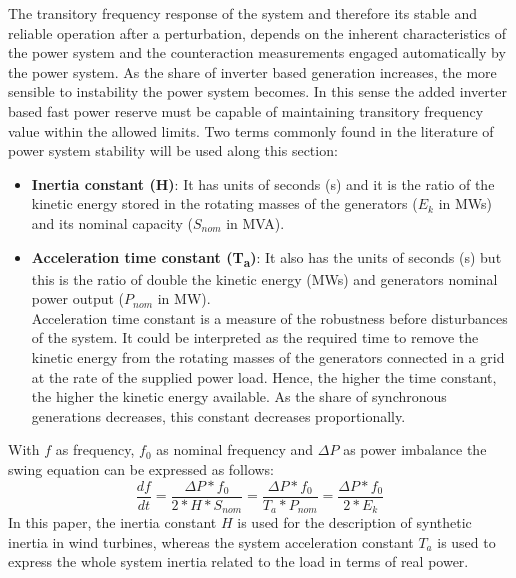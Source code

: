 The transitory frequency response of the system and therefore its stable and reliable operation after a perturbation, depends on the inherent characteristics of the power system and the counteraction measurements engaged automatically by the power system. As the share of inverter based generation increases, the more sensible to instability the power system becomes. In this sense the added inverter based fast power reserve must be capable of maintaining transitory frequency value within the allowed limits. 
Two terms commonly found in the literature of power system stability will be used along this section:

\begin{itemize}[leftmargin=*,labelsep=5.8mm]
	\item \textbf{Inertia constant (H)}: It has units of seconds (s) and it is the ratio of the kinetic energy stored in the rotating masses of the generators ($E_k$ in MWs) and its nominal capacity ($S_{nom}$ in MVA).\\
	\item \textbf{Acceleration time constant (T\textsubscript{a})}: It also has the units of seconds (s) but this is the ratio of double the kinetic energy (MWs) and generators nominal power output ($P_{nom}$ in MW).\\
	 Acceleration time constant is a measure of the robustness before disturbances of the system. It could be interpreted as the required time to remove the kinetic energy from the rotating masses of the generators connected in a grid at the rate of the supplied power load. Hence, the higher the time constant, the higher the kinetic energy available. As the share of synchronous generations decreases, this constant decreases proportionally.
\end{itemize}

With $f$ as frequency, $f_0$ as nominal frequency and $\Delta P$ as power imbalance the swing equation can be expressed as follows:
\begin{equation}
	\label{eq:swing}
	\frac{df}{dt}=\dfrac{\Delta P*f_0}{2*H*S_{nom}}=\frac{\Delta P*f_0}{T_a*P_{nom}}=\frac{\Delta P*f_0}{2*E_k}
\end{equation}
In this paper, the inertia constant $ H $ is used for the description of synthetic inertia in wind turbines, whereas the system acceleration constant $ T_a $ is used to express the whole system inertia related to the load in terms of real power.


